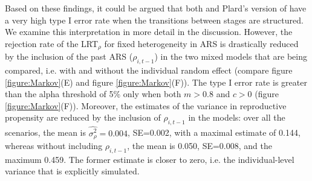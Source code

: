 Based on these findings, it could be argued that both \MM and Plard's version of \NSM \parencite{Plard2012} have a very high type I error rate when the transitions between stages are structured. We examine this interpretation in more detail in the discussion. 
However, the rejection rate of the LRT$_\rho$ for fixed heterogeneity in ARS is drastically reduced by the inclusion of the past ARS ($\rho_{i,t-1}$) in the two mixed models that are being compared, i.e. with and without the individual random effect (compare figure \ref{figure:Markov}(E) and figure \ref{figure:Markov}(F)). The type I error rate is greater than the alpha threshold of 5\% only when both $m > 0.8$ and $c > 0$ (figure \ref{figure:Markov}(F)). Moreover, the estimates of the variance in reproductive propensity are reduced by the inclusion of $\rho_{i,t-1}$ in the models: over all the scenarios, the mean is $\hat{\sigma_{\rho}^2}=0.004$, SE=0.002, with a maximal estimate of 0.144, whereas without including $\rho_{i,t-1}$, the mean is 0.050, SE=0.008, and the maximum 0.459. The former estimate is closer to zero, i.e. the individual-level variance that is explicitly simulated.

